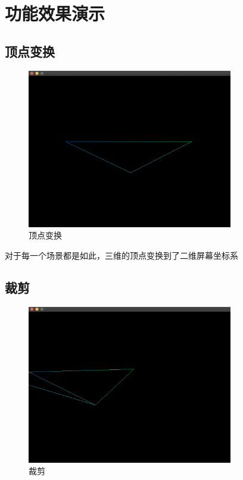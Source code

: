 

    \chapter{功能效果演示}

    \section{顶点变换}
    
	\begin{figure}[H]
    	\centering
		\includegraphics[width=0.8\textwidth]{images/demo1.png}
		\caption{顶点变换}
		\label{demo1}
    \end{figure}    
    
    对于每一个场景都是如此，三维的顶点变换到了二维屏幕坐标系

    \section{裁剪}
    
    	\begin{figure}[H]
    	\centering
		\includegraphics[width=0.8\textwidth]{images/demo2.png}
		\caption{裁剪}
		\label{demo2}
    \end{figure}  
    
